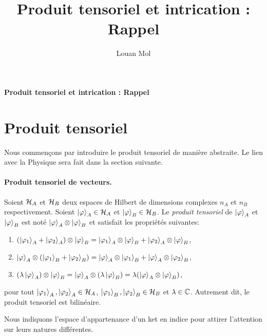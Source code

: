 \documentclass[11pt,a4paper,oneside]{article}
\title{Produit tensoriel et intrication : Rappel}
\author{Louan Mol}
\begin{document}
\begin{center}
    {\huge \textbf{Produit tensoriel et intrication : Rappel}}
\end{center}

\section{Produit tensoriel}

Nous commençons par introduire le produit tensoriel de manière abstraite. Le lien avec la Physique sera fait dans la section suivante.

\paragraph*{Produit tensoriel de vecteurs.} Soient $\mathcal{H}_A$ et $\mathcal{H}_B$ deux espaces de Hilbert de dimensions complexes $n_A$ et $n_B$ respectivement. Soient $\ket{\varphi}_A\in\mathcal{H}_A$ et $\ket{\varphi}_B\in\mathcal{H}_B$. Le \emph{produit tensoriel} de $\ket{\varphi}_A$ et $\ket{\varphi}_B$ est noté $\ket{\varphi}_A\otimes\ket{\varphi}_B$ et satisfait les propriétés suivantes:
\begin{enumerate}[label=\roman*)]
    \item $(\ket{\varphi_1}_A+\ket{\varphi_2}_A)\otimes\ket{\varphi}_B = \ket{\varphi_1}_A\otimes\ket{\varphi}_B+\ket{\varphi_2}_A\otimes\ket{\varphi}_B$,
    \item $\ket{\varphi}_A\otimes(\ket{\varphi_1}_B+\ket{\varphi_2}_B) = \ket{\varphi}_A\otimes\ket{\varphi_1}_B+\ket{\varphi}_A\otimes\ket{\varphi_2}_B$,
    \item $(\lambda\ket{\varphi}_A)\otimes\ket{\varphi}_B = \ket{\varphi}_A\otimes(\lambda\ket{\varphi}_B) = \lambda(\ket{\varphi}_A\otimes\ket{\varphi}_B)$,
\end{enumerate}
pour tout $\ket{\varphi_1}_A,\ket{\varphi_2}_A\in\mathcal{H}_A$, $\ket{\varphi_1}_B,\ket{\varphi_2}_B\in\mathcal{H}_B$ et $\lambda\in\mathbb{C}$. Autrement dit, le produit tensoriel est bilinéaire. 

Nous indiquons l'espace d'appartenance d'un ket en indice pour attirer l'attention sur leurs natures différentes.
\end{document}
